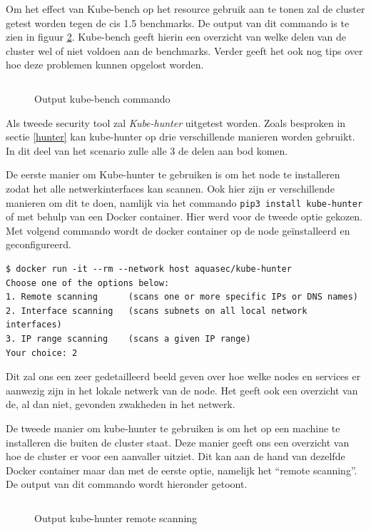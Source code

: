 Om het effect van Kube-bench op het resource gebruik aan te tonen zal de cluster getest worden tegen de cis 1.5 benchmarks. De output van dit commando is te zien in figuur \ref{benchOut}. Kube-bench geeft hierin een overzicht van welke delen van de cluster wel of niet voldoen aan de benchmarks. Verder geeft het ook nog tips over hoe deze problemen kunnen opgelost worden.

\begin{figure}[h] 
	\centering
	\inputminted[fontsize=\footnotesize,linenos]{bash}{files/benchOutput.txt}
	\caption{Output kube-bench commando}
	\label{benchOut}
\end{figure}

Als tweede security tool zal \textit{Kube-hunter} uitgetest worden. Zoals besproken in sectie \ref{hunter} kan kube-hunter op drie verschillende manieren worden gebruikt. In dit deel van het scenario zulle alle 3 de delen aan bod komen.

De eerste manier om Kube-hunter te gebruiken is om het node te installeren zodat het alle netwerkinterfaces kan scannen. Ook hier zijn er verschillende manieren om dit te doen, namlijk via het commando \verb|pip3 install kube-hunter| of met behulp van een Docker container. Hier werd voor de tweede optie gekozen. Met volgend commando wordt de docker container op de node geïnstalleerd en geconfigureerd.
\begin{verbatim} 
$ docker run -it --rm --network host aquasec/kube-hunter
Choose one of the options below:
1. Remote scanning      (scans one or more specific IPs or DNS names)
2. Interface scanning   (scans subnets on all local network interfaces)
3. IP range scanning    (scans a given IP range)
Your choice: 2
\end{verbatim}
Dit zal ons een zeer gedetailleerd beeld geven over hoe welke nodes en services er aanwezig zijn in het lokale netwerk van de node. Het geeft ook een overzicht van de, al dan niet, gevonden zwakheden in het netwerk.

De tweede manier om kube-hunter te gebruiken is om het op een machine te installeren die buiten de cluster staat. Deze manier geeft ons een overzicht van hoe de cluster er voor een aanvaller uitziet. Dit kan aan de hand van dezelfde Docker container maar dan met de eerste optie, namelijk het ``remote scanning''. De output van dit commando wordt hieronder getoont.

\begin{figure}[h] 
	\centering
	\inputminted[fontsize=\footnotesize,linenos]{bash}{files/hunterRemoteOutput.txt}
	\caption{Output kube-hunter remote scanning}
	\label{benchOut}
\end{figure}


